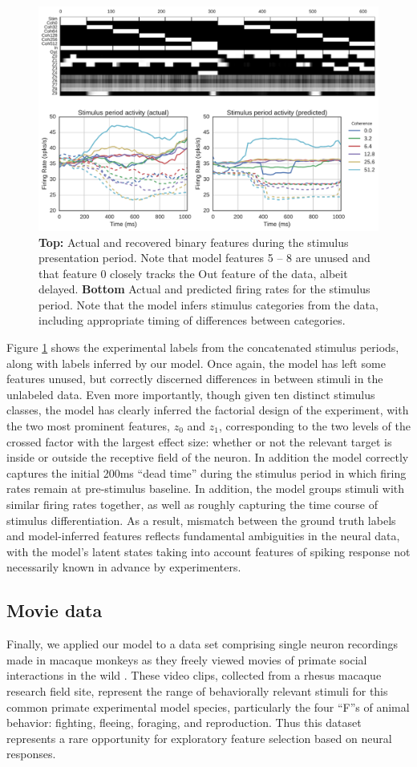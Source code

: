 \documentclass{article} %
\begin{document}
\begin{figure}[ht]
    \center
    \includegraphics[width=0.7\linewidth]{figures/roitman}
    \caption{\textbf{Top:} Actual and recovered binary features during the stimulus presentation period. Note that model features 5 -- 8 are unused and that feature 0 closely tracks the Out feature of the data, albeit delayed. \textbf{Bottom} Actual and predicted firing rates for the stimulus period. Note that the model infers stimulus categories from the data, including appropriate timing of differences between categories.}
    \label{roitman}
\end{figure}
Figure \ref{roitman} shows the experimental labels from the concatenated stimulus periods, along with labels inferred by our model. Once again, the model has left some features unused, but correctly discerned differences in between stimuli in the unlabeled data. Even more importantly, though given ten distinct stimulus classes, the model has clearly inferred the factorial design of the experiment, with the two most prominent features, $z_0$ and $z_1$, corresponding to the two levels of the crossed factor with the largest effect size: whether or not the relevant target is inside or outside the receptive field of the neuron. In addition the model correctly captures the initial 200ms ``dead time'' during the stimulus period in which firing rates remain at pre-stimulus baseline. In addition, the model groups stimuli with similar firing rates together, as well as roughly capturing the time course of stimulus differentiation. As a result, mismatch between the ground truth labels and model-inferred features reflects fundamental ambiguities in the neural data, with the model's latent states taking into account features of spiking response not necessarily known in advance by experimenters.

\subsection{Movie data}
Finally, we applied our model to a data set comprising single neuron recordings made in macaque monkeys as they freely viewed movies of primate social interactions in the wild %
 . These video clips, collected from a rhesus macaque research field site, represent the range of behaviorally relevant stimuli for this common primate experimental model species, particularly the four ``F''s of animal behavior: fighting, fleeing, foraging, and reproduction. Thus this dataset represents a rare opportunity for exploratory feature selection based on neural responses.
\end{document}
